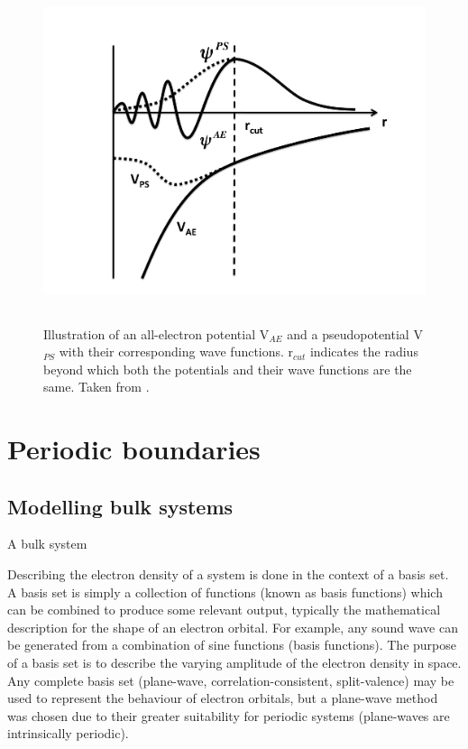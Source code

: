 \begin{figure} %
\label{figure:pseudopotential}
\begin{center}
\includegraphics[height=10cm]{images/pseudopotential.png}
\end{center}
\caption{Illustration of an all-electron potential V$_{AE}$ and a pseudopotential V$_{PS}$ with their corresponding wave functions. r$_{cut}$ indicates the radius beyond which both the potentials and their wave functions are the same. Taken from \cite{Payne1992}.  }
\end{figure}

\section{Periodic boundaries}
\subsection{Modelling bulk systems}

A bulk system 

Describing the electron density of a system is done in the context of a basis set. A basis set is simply a collection of functions (known as basis functions) which can be combined to produce some relevant output, typically the mathematical description for the shape of an electron orbital. For example, any sound wave can be generated from a combination of sine functions (basis functions). The purpose of a basis set is to describe the varying amplitude of the electron density in space. Any complete basis set (plane-wave, correlation-consistent, split-valence) may be used to represent the behaviour of electron orbitals, but a plane-wave method was chosen due to their greater suitability for periodic systems (plane-waves are intrinsically periodic). 

